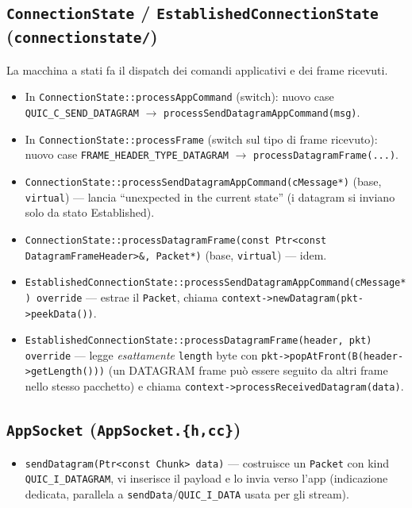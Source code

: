\documentclass[11pt,a4paper]{article}
\newcommand{\code}[1]{\texttt{#1}}
\begin{document}
\subsection{\code{ConnectionState} / \code{EstablishedConnectionState} (\code{connectionstate/})}
La macchina a stati fa il dispatch dei comandi applicativi e dei frame ricevuti.
\begin{itemize}[nosep,leftmargin=1.4em]
  \item In \code{ConnectionState::processAppCommand} (switch): nuovo case \code{QUIC\_C\_SEND\_DATAGRAM} $\to$
    \code{processSendDatagramAppCommand(msg)}.
  \item In \code{ConnectionState::processFrame} (switch sul tipo di frame ricevuto): nuovo case
    \code{FRAME\_HEADER\_TYPE\_DATAGRAM} $\to$ \code{processDatagramFrame(...)}.
  \item \code{ConnectionState::processSendDatagramAppCommand(cMessage*)} (base, \code{virtual}) --- lancia
    ``unexpected in the current state'' (i datagram si inviano solo da stato Established).
  \item \code{ConnectionState::processDatagramFrame(const Ptr<const DatagramFrameHeader>\&, Packet*)}
    (base, \code{virtual}) --- idem.
  \item \code{EstablishedConnectionState::processSendDatagramAppCommand(cMessage*) override} --- estrae il
    \code{Packet}, chiama \code{context->newDatagram(pkt->peekData())}.
  \item \code{EstablishedConnectionState::processDatagramFrame(header, pkt) override} --- legge
    \emph{esattamente} \code{length} byte con \code{pkt->popAtFront(B(header->getLength()))} (un DATAGRAM
    frame pu\`o essere seguito da altri frame nello stesso pacchetto) e chiama
    \code{context->processReceivedDatagram(data)}.
\end{itemize}

\subsection{\code{AppSocket} (\code{AppSocket.\{h,cc\}})}
\begin{itemize}[nosep,leftmargin=1.4em]
  \item \code{sendDatagram(Ptr<const Chunk> data)} --- costruisce un \code{Packet} con kind
    \code{QUIC\_I\_DATAGRAM}, vi inserisce il payload e lo invia verso l'app (indicazione dedicata,
    parallela a \code{sendData}/\code{QUIC\_I\_DATA} usata per gli stream).
\end{itemize}
\end{document}
